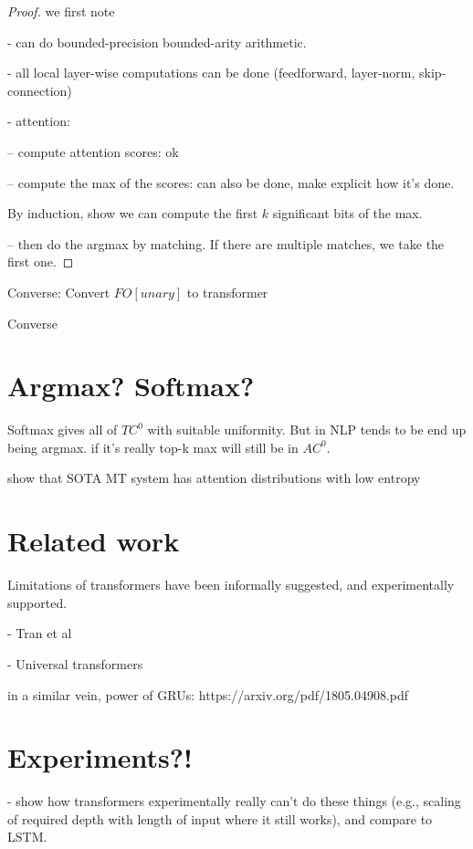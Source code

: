 \documentclass[11pt,a4paper]{article}
\begin{document}
\begin{proof}
we first note

- can do bounded-precision bounded-arity arithmetic.

- all local layer-wise computations can be done (feedforward, layer-norm, skip-connection)

- attention:

-- compute attention scores: ok

-- compute the max of the scores: can also be done, make explicit how it's done.

By induction, show we can compute the first $k$ significant bits of the max.

-- then do the argmax by matching. If there are multiple matches, we take the first one.

\end{proof}

Converse: Convert $FO[unary]$ to transformer



Converse

\section{Argmax? Softmax?}

Softmax gives all of $TC^0$ with suitable uniformity. But in NLP tends to be end up being argmax. if it's really top-k max will still be in $AC^0$.

show that SOTA MT system has attention distributions with low entropy

\section{Related work}

Limitations of transformers have been informally suggested, and experimentally supported.

- Tran et al

- Universal transformers

in a similar vein, power of GRUs: https://arxiv.org/pdf/1805.04908.pdf

\section{Experiments?!}

- show how transformers experimentally really can't do these things (e.g., scaling of required depth with length of input where it still works), and compare to LSTM.
\end{document}
